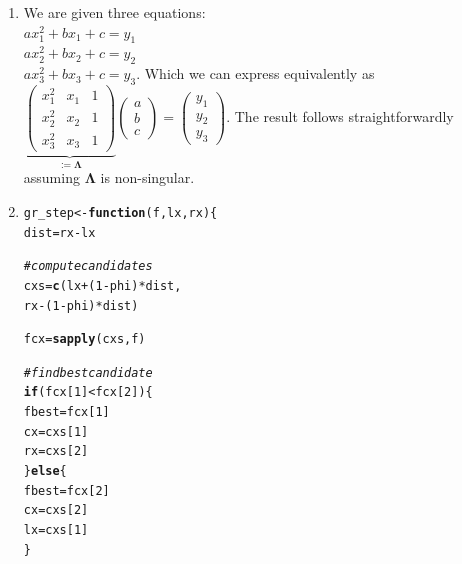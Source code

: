 \documentclass[a4paper]{article}
\makeatletter
\newcommand{\hlnum}[1]{\textcolor[rgb]{0.686,0.059,0.569}{#1}}%
\newcommand{\hlcom}[1]{\textcolor[rgb]{0.678,0.584,0.686}{\textit{#1}}}%
\newcommand{\hlopt}[1]{\textcolor[rgb]{0,0,0}{#1}}%
\newcommand{\hlstd}[1]{\textcolor[rgb]{0.345,0.345,0.345}{#1}}%
\newcommand{\hlkwa}[1]{\textcolor[rgb]{0.161,0.373,0.58}{\textbf{#1}}}%
\newcommand{\hlkwb}[1]{\textcolor[rgb]{0.69,0.353,0.396}{#1}}%
\newcommand{\hlkwc}[1]{\textcolor[rgb]{0.333,0.667,0.333}{#1}}%
\newcommand{\hlkwd}[1]{\textcolor[rgb]{0.737,0.353,0.396}{\textbf{#1}}}%
\newenvironment{kframe}{%
 \def\at@end@of@kframe{}%
 \ifinner\ifhmode%
  \def\at@end@of@kframe{\end{minipage}}%
  \begin{minipage}{\columnwidth}%
 \fi\fi%
 \def\FrameCommand##1{\hskip\@totalleftmargin \hskip-\fboxsep
 \colorbox{shadecolor}{##1}\hskip-\fboxsep
     \hskip-\linewidth \hskip-\@totalleftmargin \hskip\columnwidth}%
 \MakeFramed {\advance\hsize-\width
   \@totalleftmargin\z@ \linewidth\hsize
   \@setminipage}}%
 {\par\unskip\endMakeFramed%
 \at@end@of@kframe}
\newenvironment{knitrout}{}{} %
\makeatother
\begin{document}
{\begin{enumerate}
\begin{knitrout}
\begin{kframe}
\begin{alltt}
\hlkwd{gr}\hlstd{(ft1)}
\end{alltt}
\begin{verbatim}
## [1] -2.45898 29.91294
\end{verbatim}
\end{kframe}
\end{knitrout}
	\item 
	We are given three equations: \\
	$a x_1^2 + b x_1 + c = y_1$ \\
	$a x_2^2 + b x_2 + c = y_2$ \\
	$a x_3^2 + b x_3 + c = y_3$. 
	Which we can express equivalently as $\underbrace{\begin{pmatrix}  x_1^2 & x_1 & 1 \\ x_2^2 & x_2 & 1 \\ x_3^2 & x_3 & 1 \end{pmatrix}}_{:=\bm{\Lambda}} \begin{pmatrix}a \\ b \\ c \end{pmatrix} = \begin{pmatrix}y_1 \\ y_2 \\ y_3 \end{pmatrix}.$ The result follows straightforwardly assuming $\bm{\Lambda}$ is non-singular.
	
	\item 
\begin{knitrout}
\color{fgcolor}\begin{kframe}
\begin{alltt}
\hlstd{gr_step} \hlkwb{<-} \hlkwa{function}\hlstd{(}\hlkwc{f}\hlstd{,} \hlkwc{lx}\hlstd{,} \hlkwc{rx}\hlstd{)\{}
  \hlstd{dist} \hlkwb{=} \hlstd{rx} \hlopt{-} \hlstd{lx}

  \hlcom{# compute candidates}
  \hlstd{cxs} \hlkwb{=} \hlkwd{c}\hlstd{(lx} \hlopt{+} \hlstd{(}\hlnum{1}\hlopt{-}\hlstd{phi)} \hlopt{*} \hlstd{dist,}
    \hlstd{rx} \hlopt{-} \hlstd{(}\hlnum{1}\hlopt{-}\hlstd{phi)} \hlopt{*} \hlstd{dist)}

  \hlstd{fcx} \hlkwb{=} \hlkwd{sapply}\hlstd{(cxs, f)}

  \hlcom{# find best candidate}
  \hlkwa{if} \hlstd{(fcx[}\hlnum{1}\hlstd{]} \hlopt{<} \hlstd{fcx[}\hlnum{2}\hlstd{])\{}
    \hlstd{fbest} \hlkwb{=} \hlstd{fcx[}\hlnum{1}\hlstd{]}
    \hlstd{cx} \hlkwb{=} \hlstd{cxs[}\hlnum{1}\hlstd{]}
    \hlstd{rx} \hlkwb{=} \hlstd{cxs[}\hlnum{2}\hlstd{]}
  \hlstd{\}}\hlkwa{else}\hlstd{\{}
    \hlstd{fbest} \hlkwb{=} \hlstd{fcx[}\hlnum{2}\hlstd{]}
    \hlstd{cx} \hlkwb{=} \hlstd{cxs[}\hlnum{2}\hlstd{]}
    \hlstd{lx} \hlkwb{=} \hlstd{cxs[}\hlnum{1}\hlstd{]}
  \hlstd{\}}


\end{alltt}
\end{kframe}
\end{knitrout}
\end{enumerate}}
\end{document}
